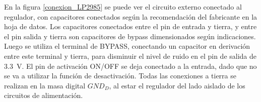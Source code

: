 En la figura \ref{conexion_LP2985} se puede ver el circuito externo conectado al regulador, con capacitores conectados según la recomendación del fabricante en la hoja de datos. Los capacitores conectados entre el pin de entrada y tierra, y entre el pin salida y tierra son capacitores de bypass dimensionados según indicaciones. Luego se utiliza el terminal de BYPASS, conectando un capacitor en derivación entre este terminal y tierra, para disminuir el nivel de ruido en el pin de salida de \SI{3.3}{\volt}. El pin de activación ON/OFF se deja conectado a la entrada, dado que no se va a utilizar la función de desactivación. Todas las conexiones a tierra se realizan en la masa digital $GND_D$, al estar el regulador del lado aislado de los circuitos de alimentación.\\
